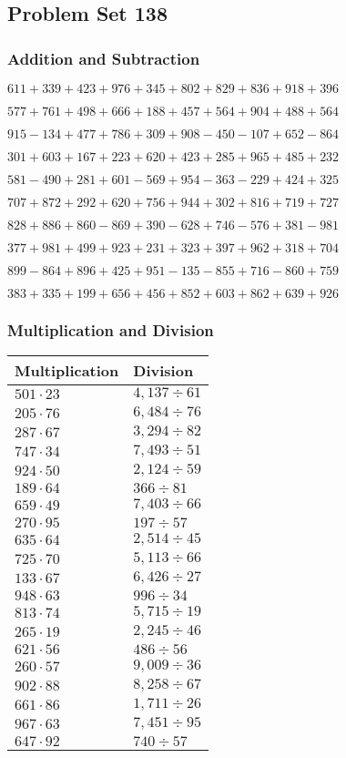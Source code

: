 \hypertarget{problem-set-138}{%
\subsection{Problem Set 138}\label{problem-set-138}}

\hypertarget{addition-and-subtraction}{%
\subsubsection{Addition and
Subtraction}\label{addition-and-subtraction}}

\(611 +339 +423 +976 +345 +802 +829 +836 +918 +396\)

\(577 +761 +498 +666 +188 +457 +564 +904 +488 +564\)

\(915 - 134 +477 +786 +309 +908 - 450 - 107 +652 - 864\)

\(301 +603 +167 +223 +620 +423 +285 +965 +485 +232\)

\(581 - 490 +281 +601 - 569 +954 - 363 - 229 +424 +325\)

\(707 +872 +292 +620 +756 +944 +302 +816 +719 +727\)

\(828 +886 +860 - 869 +390 - 628 +746 - 576 +381 - 981\)

\(377 +981 +499 +923 +231 +323 +397 +962 +318 +704\)

\(899 - 864 +896 +425 +951 - 135 - 855 +716 - 860 +759\)

\(383 +335 +199 +656 +456 +852 +603 +862 +639 +926\)

\hypertarget{multiplication-and-division}{%
\subsubsection{Multiplication and
Division}\label{multiplication-and-division}}

\begin{longtable}[]{@{}ll@{}}
\toprule
Multiplication & Division\tabularnewline
\midrule
\endhead
\(501 \cdot 23\) & \(4,137÷61\)\tabularnewline
\(205 \cdot 76\) & \(6,484÷76\)\tabularnewline
\(287 \cdot 67\) & \(3,294÷82\)\tabularnewline
\(747 \cdot 34\) & \(7,493÷51\)\tabularnewline
\(924 \cdot 50\) & \(2,124÷59\)\tabularnewline
\(189 \cdot 64\) & \(366÷81\)\tabularnewline
\(659 \cdot 49\) & \(7,403÷66\)\tabularnewline
\(270 \cdot 95\) & \(197÷57\)\tabularnewline
\(635 \cdot 64\) & \(2,514÷45\)\tabularnewline
\(725 \cdot 70\) & \(5,113÷66\)\tabularnewline
\(133 \cdot 67\) & \(6,426÷27\)\tabularnewline
\(948 \cdot 63\) & \(996÷34\)\tabularnewline
\(813 \cdot 74\) & \(5,715÷19\)\tabularnewline
\(265 \cdot 19\) & \(2,245÷46\)\tabularnewline
\(621 \cdot 56\) & \(486÷56\)\tabularnewline
\(260 \cdot 57\) & \(9,009÷36\)\tabularnewline
\(902 \cdot 88\) & \(8,258÷67\)\tabularnewline
\(661 \cdot 86\) & \(1,711÷26\)\tabularnewline
\(967 \cdot 63\) & \(7,451÷95\)\tabularnewline
\(647 \cdot 92\) & \(740÷57\)\tabularnewline
\bottomrule
\end{longtable}
